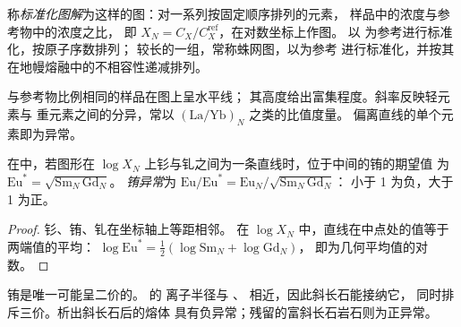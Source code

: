 \begin{definition}[标准化图解]\label{def:b2:elements-in-the-earth:normalised}
称\emph{标准化图解}为这样的图：对一系列按固定顺序排列的元素，
样品中的浓度与参考物中的浓度之比，
即 $X_N = C_X/C_X^{\mathrm{ref}}$，在对数坐标上作图。
以 为参考进行标准化，按原子序数排列；
较长的一组，常称蛛网图，以为参考
进行标准化，并按其在地幔熔融中的不相容性递减排列。
\end{definition}

与参考物比例相同的样品在图上呈水平线；
其高度给出富集程度。斜率反映轻元素与
重元素之间的分异，常以 $(\mathrm{La}/\mathrm{Yb})_N$ 之类的比值度量。
偏离直线的单个元素即为异常。

\begin{proposition}[铕异常]\label{prop:b2:elements-in-the-earth:normalised}
在中，若图形在
$\log X_N$ 上钐与钆之间为一条直线时，位于中间的铕的期望值
为 $\mathrm{Eu}^* = \sqrt{\mathrm{Sm}_N\,\mathrm{Gd}_N}$。
\emph{铕异常}为
$\mathrm{Eu}/\mathrm{Eu}^* = \mathrm{Eu}_N/\sqrt{\mathrm{Sm}_N\,\mathrm{Gd}_N}$：
小于 1 为负，大于 1 为正。
\end{proposition}

\begin{proof}
钐、铕、钆在坐标轴上等距相邻。
在 $\log X_N$ 中，直线在中点处的值等于两端值的平均：
$\log \mathrm{Eu}^* = \tfrac12(\log \mathrm{Sm}_N + \log \mathrm{Gd}_N)$，
即为几何平均值的对数。
\end{proof}

铕是唯一可能呈二价的。 的
离子半径与 、 相近，因此斜长石能接纳它，
同时排斥三价。析出斜长石后的熔体
具有负异常；残留的富斜长石岩石则为正异常。

